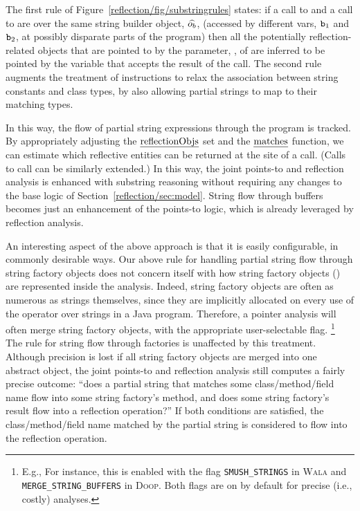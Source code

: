 The first rule of Figure~\ref{reflection/fig/substringrules} states:
if a call to  and a call to  are over the
same string builder object, \(\widehat{o_b}\), (accessed by different
vars, \(\texttt{b}_1\) and \(\texttt{b}_2\), at possibly disparate parts of
the program) then all the potentially reflection-related objects that
are pointed to by the parameter, , of  are
inferred to be pointed by the variable  that accepts the result
of the  call.
%
The second rule augments the treatment of  instructions
to relax the association between string constants and class types, by
also allowing partial strings to map to their matching types.

In this way, the flow of partial string expressions through the
program is tracked. By appropriately adjusting the \(\text{\emph{reflectionObjs}}\)
set and the \(\text{\emph{matches}}\) function, we can estimate which
reflective entities can be returned at the site of a 
call. (Calls to  call can be similarly extended.) In
this way, the joint points-to and reflection analysis is enhanced with
substring reasoning without requiring any changes to the base logic of
Section~\ref{reflection/sec:model}. String flow through buffers
becomes just an enhancement of the points-to logic, which is already
leveraged by reflection analysis.

An interesting aspect of the above approach is that it is easily
configurable, in commonly desirable ways. Our above rule for handling
partial string flow through string factory objects does not concern
itself with how string factory objects () are represented
inside the analysis. Indeed, string factory objects are often as
numerous as strings themselves, since they are implicitly allocated on
every use of the \code{+} operator over strings in a Java program.
Therefore, a pointer analysis will often merge string factory objects,
with the appropriate user-selectable flag.%
\footnote{E.g., For instance, this is enabled with the flag
  \texttt{SMUSH\_STRINGS} in \textsc{Wala} \cite{www:wala-reflection}
  and \texttt{MERGE\_STRING\_BUFFERS} in \textsc{Doop}.  Both flags
  are on by default for precise (i.e., costly) analyses.}
The rule for string flow through
factories is unaffected by this treatment. Although precision is lost
if all string factory objects are merged into one abstract object, the
joint points-to and reflection analysis still computes a fairly
precise outcome: ``does a partial string that matches some
class/method/field name flow into some string factory's 
method, and does some string factory's  result flow into
a reflection operation?'' If both conditions are satisfied, the
class/method/field name matched by the partial string is considered to
flow into the reflection operation.


